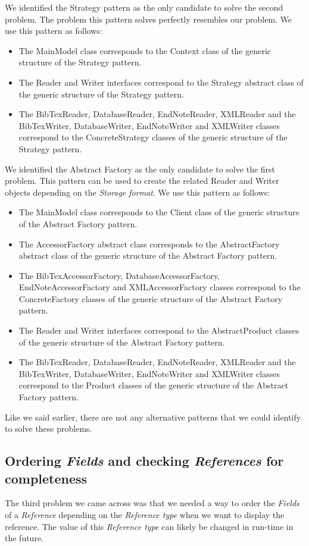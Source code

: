 \documentclass[a4paper]{article}
\begin{document}
We identified the Strategy pattern as the only candidate to solve the second problem. The problem this pattern solves perfectly resembles our problem. We use this pattern as follows: 

\begin{itemize}
	\item The MainModel class corresponds to the Context class of the generic structure of the Strategy pattern.
	\item The Reader and Writer interfaces correspond to the Strategy abstract class of the generic structure of the Strategy pattern.
	\item The BibTexReader, DatabaseReader, EndNoteReader, XMLReader and the BibTexWriter, DatabaseWriter, EndNoteWriter and XMLWriter classes correspond to the ConcreteStrategy classes of the generic structure of the Strategy pattern.
\end{itemize}

We identified the Abstract Factory as the only candidate to solve the first problem. This pattern can be used to create the related Reader and Writer objects depending on the \textit{Storage format}. We use this pattern as follows:

\begin{itemize}
	\item The MainModel class corresponds to the Client class of the generic structure of the Abstract Factory pattern.
	\item The AccessorFactory abstract class corresponds to the AbstractFactory abstract class of the generic structure of the Abstract Factory pattern.
	\item The BibTexAccessorFactory, DatabaseAccessorFactory, EndNoteAccessorFactory and XMLAccessorFactory classes correspond to the ConcreteFactory classes of the generic structure of the Abstract Factory pattern.
	\item The Reader and Writer interfaces correspond to the AbstractProduct classes of the generic structure of the Abstract Factory pattern.
	\item The BibTexReader, DatabaseReader, EndNoteReader, XMLReader and the BibTexWriter, DatabaseWriter, EndNoteWriter and XMLWriter classes correspond to the Product classes of the generic structure of the Abstract Factory pattern.
\end{itemize}

Like we said earlier, there are not any alternative patterns that we could identify to solve these problems.

\subsection{Ordering \textit{Fields} and checking \textit{References} for completeness}
The third problem we came across was that we needed a way to order the \textit{Fields} of a \textit{Reference} depending on the \textit{Reference type} when we want to display the reference. The value of this \textit{Reference type} can likely be changed in run-time in the future.
\end{document}
